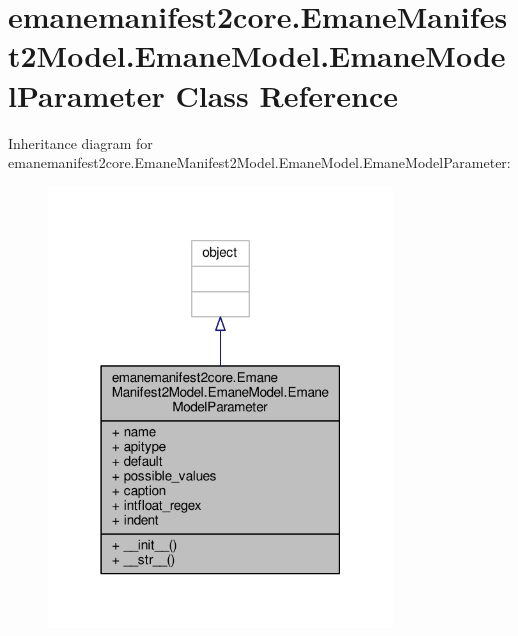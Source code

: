 \hypertarget{classemanemanifest2core_1_1_emane_manifest2_model_1_1_emane_model_1_1_emane_model_parameter}{\section{emanemanifest2core.\+Emane\+Manifest2\+Model.\+Emane\+Model.\+Emane\+Model\+Parameter Class Reference}
\label{classemanemanifest2core_1_1_emane_manifest2_model_1_1_emane_model_1_1_emane_model_parameter}
}


Inheritance diagram for emanemanifest2core.\+Emane\+Manifest2\+Model.\+Emane\+Model.\+Emane\+Model\+Parameter\+:
\nopagebreak
\begin{figure}[H]
\begin{center}
\leavevmode
\includegraphics[width=259pt]{classemanemanifest2core_1_1_emane_manifest2_model_1_1_emane_model_1_1_emane_model_parameter__inherit__graph}
\end{center}
\end{figure}


